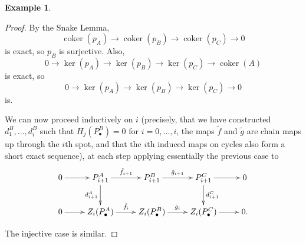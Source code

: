 \documentclass{amsart}[12pt]
\def\ker{\operatorname{ker}}
\def\coker{\operatorname{coker}}
\numberwithin{equation}{section}
\theoremstyle{plain} %
\theoremstyle{definition}
\newtheorem{ex}[equation]{Example}
\theoremstyle{remark}
\begin{document}
\begin{ex}
\begin{proof}
      By the Snake Lemma,
      \[  \coker(p_A) \to \coker(p_B) \to \coker(p_C) \to 0\]
      is exact, so $p_B$ is surjective. Also, 
      \[  0 \to \ker(p_A) \to \ker(p_B) \to \ker(p_C) \to \coker(A) \] is exact, so 
   \[  0 \to \ker(p_A) \to \ker(p_B) \to \ker(p_C) \to 0 \] is.
   
   We can now proceed inductively on $i$ (precisely, that we have constructed $d^B_1,\dots,d^B_i$ such that $H_j(P^B_\bullet)=0$ for $i=0,\dots,i$, the maps $\tilde{f}$ and $\tilde{g}$ are chain maps up through the $i$th spot, and that the $i$th induced maps on cycles also form a short exact sequence), at each step applying essentially the previous case to
       \[ \xymatrix{ 0 \ar[r] & P_{i+1}^A \ar[r]^{\tilde{f}_{i+1}} \ar[d]_{d_{i+1}^A} & P_{i+1}^B \ar[r]^{\tilde{g}_{i+1}}  & P_{i+1}^C \ar[r] \ar[d]^{d_{i+1}^C}  & 0 \\ 
      0 \ar[r] & Z_i(P_\bullet^A) \ar[r]^{\tilde{f}_{i}} &  Z_i(P_\bullet^B) \ar[r]^{\tilde{g}_{i}} &  Z_i(P_\bullet^C) \ar[r] & 0.}\]
      
      The injective case is similar.
      \end{proof}



\end{ex}
\end{document}
